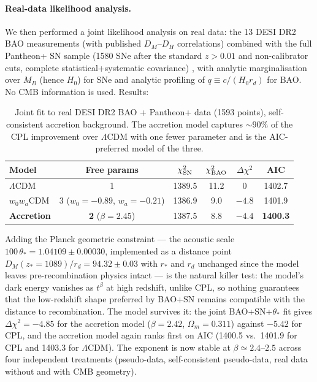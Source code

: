 \documentclass[11pt]{article}
\begin{document}
\paragraph{Real-data likelihood analysis.} We then performed a joint likelihood analysis on real data: the 13 DESI DR2 BAO measurements (with published $D_M$--$D_H$ correlations) \cite{DESIDR2BAO} combined with the full Pantheon+ SN sample (1580 SNe after the standard $z>0.01$ and non-calibrator cuts, complete statistical+systematic covariance) \cite{Pantheon}, with analytic marginalisation over $M_B$ (hence $H_0$) for SNe and analytic profiling of $q \equiv c/(H_0 r_d)$ for BAO. No CMB information is used. Results:

\begin{table}[h]
\centering
\begin{tabular}{lccccc}
\toprule
Model & Free params & $\chi^2_{\rm SN}$ & $\chi^2_{\rm BAO}$ & $\Delta\chi^2$ & AIC \\
\midrule
$\Lambda$CDM & 1 & 1389.5 & 11.2 & $0$ & 1402.7 \\
$w_0w_a$CDM & 3 ($w_0{=}-0.89$, $w_a{=}-0.21$) & 1386.9 & 9.0 & $-4.8$ & 1401.9 \\
\textbf{Accretion} & \textbf{2} ($\beta = 2.45$) & 1387.5 & 8.8 & $-4.4$ & \textbf{1400.3} \\
\bottomrule
\end{tabular}
\caption{Joint fit to real DESI DR2 BAO + Pantheon+ data (1593 points), self-consistent accretion background. The accretion model captures $\sim 90\%$ of the CPL improvement over $\Lambda$CDM with one fewer parameter and is the AIC-preferred model of the three.}
\label{tab:real}
\end{table}

Adding the Planck geometric constraint --- the acoustic scale $100\,\theta_* = 1.04109 \pm 0.00030$, implemented as a distance point $D_M(z_*{=}1089)/r_d = 94.32 \pm 0.03$ with $r_*$ and $r_d$ unchanged since the model leaves pre-recombination physics intact --- is the natural killer test: the model's dark energy vanishes as $t^{\beta}$ at high redshift, unlike CPL, so nothing guarantees that the low-redshift shape preferred by BAO+SN remains compatible with the distance to recombination. The model survives it: the joint BAO+SN+$\theta_*$ fit gives $\Delta\chi^2 = -4.85$ for the accretion model ($\beta = 2.42$, $\Omega_m = 0.311$) against $-5.42$ for CPL, and the accretion model again ranks first on AIC (1400.5 vs.\ 1401.9 for CPL and 1403.3 for $\Lambda$CDM). The exponent is now stable at $\beta \simeq 2.4$--$2.5$ across four independent treatments (pseudo-data, self-consistent pseudo-data, real data without and with CMB geometry).
\end{document}

